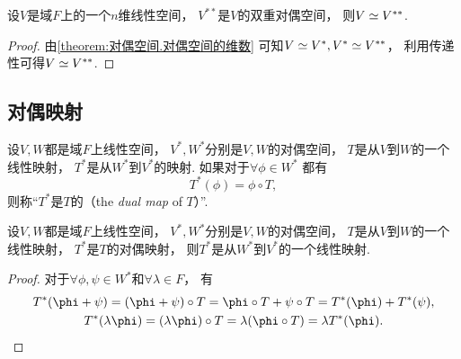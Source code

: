 \begin{corollary}
设\(V\)是域\(F\)上的一个\(n\)维线性空间，
\(V^{**}\)是\(V\)的双重对偶空间，
则\(V \simeq V^{**}\).
\begin{proof}
由\cref{theorem:对偶空间.对偶空间的维数}
可知\(V \simeq V^*,
V^* \simeq V^{**}\)，
利用传递性可得\(V \simeq V^{**}\).
\end{proof}
\end{corollary}


\subsection{对偶映射}
\begin{definition}
设\(V,W\)都是域\(F\)上线性空间，
\(V^*,W^*\)分别是\(V,W\)的对偶空间，
\(T\)是从\(V\)到\(W\)的一个线性映射，
\(T^*\)是从\(W^*\)到\(V^*\)的映射.
如果对于\(\forall \phi \in W^*\)
都有\begin{equation*}
	T^*(\phi) = \phi \circ T,
\end{equation*}
则称“\(T^*\)是\(T\)的（the \emph{dual map} of \(T\)）”.
\end{definition}

\begin{proposition}
设\(V,W\)都是域\(F\)上线性空间，
\(V^*,W^*\)分别是\(V,W\)的对偶空间，
\(T\)是从\(V\)到\(W\)的一个线性映射，
\(T^*\)是\(T\)的对偶映射，
则\(T^*\)是从\(W^*\)到\(V^*\)的一个线性映射.
\begin{proof}
对于\(\forall \phi,\psi \in W^*\)和\(\forall \lambda \in F\)，
有\begin{gather*}
	T^*(\phi+\psi)
	= (\phi+\psi) \circ T
	= \phi \circ T + \psi \circ T
	= T^*(\phi) + T^*(\psi), \\
	T^*(\lambda\phi)
	= (\lambda\phi) \circ T
	= \lambda (\phi \circ T)
	= \lambda T^*(\phi).
	\qedhere
\end{gather*}
\end{proof}
\end{proposition}

